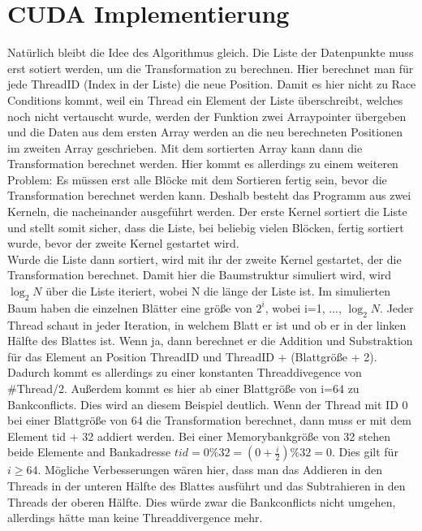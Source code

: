 \documentclass[sigconf]{acmart}
\begin{document}
\section{CUDA Implementierung}

Natürlich bleibt die Idee des Algorithmus gleich. Die Liste der Datenpunkte muss erst sotiert werden, um die Transformation zu berechnen. Hier berechnet man für jede ThreadID (Index in der Liste) die neue Position. Damit es hier nicht zu Race Conditions kommt, weil ein Thread ein Element der Liste überschreibt, welches noch nicht vertauscht wurde, werden der Funktion zwei Arraypointer übergeben und die Daten aus dem ersten Array werden an die neu berechneten Positionen im zweiten Array geschrieben. Mit dem sortierten Array kann dann die Transformation berechnet werden. Hier kommt es allerdings zu einem weiteren Problem: Es müssen erst alle Blöcke mit dem Sortieren fertig sein, bevor die Transformation berechnet werden kann. Deshalb besteht das Programm aus zwei Kerneln, die nacheinander ausgeführt werden. Der erste Kernel sortiert die Liste und stellt somit sicher, dass die Liste, bei beliebig vielen Blöcken, fertig sortiert wurde, bevor der zweite Kernel gestartet wird.\\ Wurde die Liste dann sortiert, wird mit ihr der zweite Kernel gestartet, der die Transformation berechnet. Damit hier die Baumstruktur simuliert wird, wird $\log_2 N$ über die Liste iteriert, wobei N die länge der Liste ist. Im simulierten Baum haben die einzelnen Blätter eine größe von $2^i$, wobei i=1, ..., $\log_2 N$. Jeder Thread schaut in jeder Iteration, in welchem Blatt er ist und ob er in der linken Hälfte des Blattes ist. Wenn ja, dann berechnet er die Addition und Substraktion für das Element an Position ThreadID und ThreadID + (Blattgröße + 2). Dadurch kommt es allerdings zu einer konstanten Threaddivegence von \#Thread/2. Außerdem kommt es hier ab einer Blattgröße von i=64 zu Bankconflicts. Dies wird an diesem Beispiel deutlich. Wenn der Thread mit ID 0 bei einer Blattgröße von 64 die Transformation berechnet, dann muss er mit dem Element tid + 32 addiert werden. Bei einer Memorybankgröße von 32 stehen beide Elemente and Bankadresse $tid = 0 \% 32 = (0+\frac{i}{2}) \% 32 = 0$. Dies gilt für $i \geq 64$. Mögliche Verbesserungen wären hier, dass man das Addieren in den Threads in der unteren Hälfte des Blattes ausführt und das Subtrahieren in den Threads der oberen Hälfte. Dies würde zwar die Bankconflicts nicht umgehen, allerdings hätte man keine Threaddivergence mehr.
\end{document}
